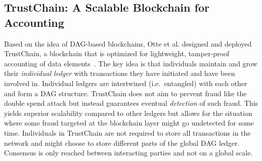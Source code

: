 \subsection{TrustChain: A Scalable Blockchain for Accounting} \label{sec:trustchain}
Based on the idea of DAG-based blockchains, Otte et al. designed and deployed TrustChain, a blockchain that is optimized for lightweight, tamper-proof accounting of data elements~\cite{otte2017trustchain}.
The key idea is that individuals maintain and grow their \emph{individual ledger} with transactions they have initiated and have been involved in.
Individual ledgers are intertwined (i.e.\ entangled) with each other and form a DAG structure.
TrustChain does not aim to prevent fraud like the double spend attack but instead guarantees eventual \emph{detection} of such fraud.
This yields superior scalability compared to other ledgers but allows for the situation where some fraud targeted at the blockchain layer might go undetected for some time.
Individuals in TrustChain are not required to store all transactions in the network and might choose to store different parts of the global DAG ledger.
Consensus is only reached between interacting parties and not on a global scale.

